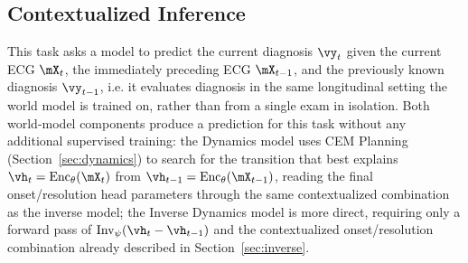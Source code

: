 \subsection{Contextualized Inference}
\label{sec:contextualized}

This task asks a model to predict the current diagnosis $\vy_t$ given the current ECG $\mX_t$, the immediately preceding ECG $\mX_{t-1}$, and the previously known diagnosis $\vy_{t-1}$, i.e. it evaluates diagnosis in the same longitudinal setting the world model is trained on, rather than from a single exam in isolation. Both world-model components produce a prediction for this task without any additional supervised training: the Dynamics model uses CEM Planning (Section~\ref{sec:dynamics}) to search for the transition that best explains $\vh_t=\text{Enc}_\theta(\mX_t)$ from $\vh_{t-1}=\text{Enc}_\theta(\mX_{t-1})$, reading the final onset/resolution head parameters through the same contextualized combination as the inverse model; the Inverse Dynamics model is more direct, requiring only a forward pass of $\text{Inv}_\psi(\vh_t-\vh_{t-1})$ and the contextualized onset/resolution combination already described in Section~\ref{sec:inverse}.


